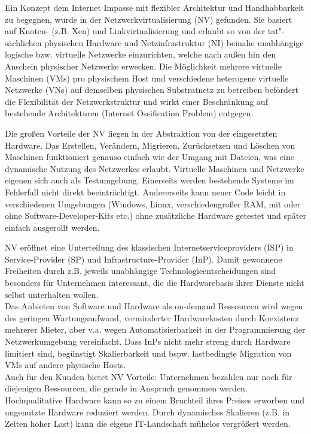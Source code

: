 Ein Konzept dem Internet Impasse mit flexibler Architektur und Handhabbarkeit zu begegnen, wurde in der Netzwerkvirtualisierung (NV) gefunden. \cite{anderson2005overcoming, bays2012security, fischer2013virtual} Sie basiert auf Knoten- (z.B. Xen) und Linkvirtualisierung und erlaubt so von der tat"-sächlichen physischen Hardware und Netzinfrastruktur (NI) beinahe unabhängige logische bzw. virtuelle Netzwerke einzurichten, welche nach außen hin den Anschein physischer Netzwerke erwecken. Die Möglichkeit mehrere virtuelle Maschinen (VMs) pro physischem Host und verschiedene heterogene virtuelle Netzwerke (VNs) auf demselben physischen Substratnetz zu betreiben befördert die Flexibilität der Netzwerkstruktur und wirkt einer Beschränkung auf bestehende Architekturen (Internet Ossification Problem) entgegen. \cite{anderson2005overcoming}

Die großen Vorteile der NV liegen in der Abstraktion von der eingesetzten Hardware. Das Erstellen, Verändern, Migrieren, Zurücksetzen und Löschen von Maschinen funktioniert genauso einfach wie der Umgang mit Dateien, was eine dynamische Nutzung des Netzwerkes erlaubt. Virtuelle Maschinen und Netzwerke eigenen sich auch als Testumgebung. Einerseits werden bestehende Systeme im Fehlerfall nicht direkt beeinträchtigt. Andererseits kann neuer Code leicht in verschiedenen Umgebungen (Windows, Linux, verschiedengroßer RAM, mit oder ohne Software-Developer-Kits etc.) ohne zusätzliche Hardware getestet und später einfach ausgerollt werden.

NV eröffnet eine Unterteilung des klassischen Internetserviceproviders (ISP) in Service-Provider (SP) und Infrastructure-Provider (InP). Damit gewonnene Freiheiten durch z.B. jeweils unabhängige Technologieentscheidungen sind besonders für Unternehmen interessant, die die Hardwarebasis ihrer Dienste nicht selbst unterhalten wollen.  \cite{wang2016towards}\\
Das Anbieten von Software und Hardware als on-demand Ressourcen wird wegen des geringen Wartungsaufwand, verminderter Hardwarekosten durch Koexistenz mehrerer Mieter, aber v.a. wegen Automatisierbarkeit in der Programmierung der Netzwerkumgebung vereinfacht. Dass InPs nicht mehr streng durch Hardware limitiert sind, begünstigt Skalierbarkeit und bspw. lastbedingte Migration von VMs auf andere physische Hosts.\\
Auch für den Kunden bietet NV Vorteile: Unternehmen bezahlen nur noch für diejenigen Ressourcen, die gerade in Anspruch genommen werden. Hochqualitative Hardware kann so zu einem Bruchteil ihres Preises erworben und ungenutzte Hardware reduziert werden. Durch dynamisches Skalieren (z.B. in Zeiten hoher Last) kann die eigene IT-Landschaft mühelos vergrößert werden.

